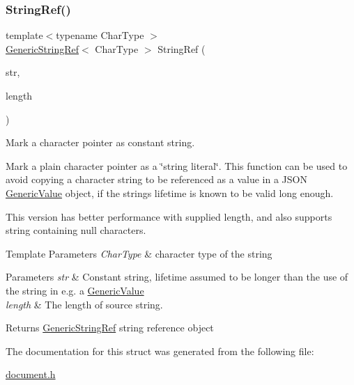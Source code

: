 \subsubsection{\texorpdfstring{String\+Ref()}{StringRef()}\hspace{0.1cm}{\footnotesize\ttfamily [2/2]}}
{\footnotesize\ttfamily template$<$typename Char\+Type $>$ \\
\hyperlink{a02008}{Generic\+String\+Ref}$<$ Char\+Type $>$ String\+Ref (\begin{DoxyParamCaption}\item[{const Char\+Type $\ast$}]{str,  }\item[{size\+\_\+t}]{length }\end{DoxyParamCaption})\hspace{0.3cm}{\ttfamily [related]}}



Mark a character pointer as constant string. 

Mark a plain character pointer as a \char`\"{}string literal\char`\"{}. This function can be used to avoid copying a character string to be referenced as a value in a J\+S\+ON \hyperlink{a01992}{Generic\+Value} object, if the string\textquotesingle{}s lifetime is known to be valid long enough.

This version has better performance with supplied length, and also supports string containing null characters.


\begin{DoxyTemplParams}{Template Parameters}
{\em Char\+Type} & character type of the string \\
\hline
\end{DoxyTemplParams}

\begin{DoxyParams}{Parameters}
{\em str} & Constant string, lifetime assumed to be longer than the use of the string in e.\+g. a \hyperlink{a01992}{Generic\+Value} \\
\hline
{\em length} & The length of source string. \\
\hline
\end{DoxyParams}
\begin{DoxyReturn}{Returns}
\hyperlink{a02008}{Generic\+String\+Ref} string reference object 
\end{DoxyReturn}


The documentation for this struct was generated from the following file\+:\begin{DoxyCompactItemize}
\item 
\hyperlink{a00476}{document.\+h}\end{DoxyCompactItemize}
